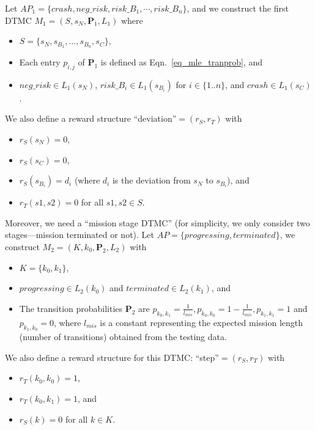 Let $AP_1=\{crash, neg\_risk, risk\_B_1,\cdots, risk\_B_n\}$, and 
we construct the first DTMC $M_1=(S,s_N,\textbf{P}_1,L_1)$ where
\begin{itemize}
    \item $S=\{s_N, s_{B_1},\dots,s_{B_n}, s_C\}$,
    \item Each entry $p_{i,j}$ of 
$\textbf{P}_1$ is defined as Eqn.~\eqref{eq_mle_tranprob}, and 
    \item $neg\_risk \in L_1(s_N)$,  $risk\_B_i\in L_1(s_{B_i})$ for $i\in \{1..n\}$, and
     $crash \in L_1(s_C)$.
\end{itemize}    We also define a reward structure 
{``deviation''}$=(r_S,r_T)$ with
\begin{itemize}
    \item $r_S(s_N)=0$,
    \item $r_S(s_C)=0$,
    \item $r_S(s_{B_i})=d_i$ (where $d_i$ is the deviation from $s_N$ to $s_{B_i}$), and 
    \item $r_T(s1,s2)=0$ for all $s1, s2 \in S$.
\end{itemize} 


Moreover, we %
need a ``mission stage DTMC'' (for simplicity, we only consider two stages---mission terminated or not). Let $AP=\{progressing,terminated\}$, we construct
$M_2=(K,k_0,\textbf{P}_2,L_2)$ with
\begin{itemize}
    \item $K=\{k_0,k_1\}$,
    \item $progressing \in L_2(k_0)$ and $terminated \in L_2(k_1)$, and 
    \item The transition probabilities $\textbf{P}_2$ are $p_{k_0,k_1}=\frac{1}{l_{mis}},p_{k_0,k_0}=1-\frac{1}{l_{mis}}, p_{k_1,k_1}=1$ and $p_{k_1,k_0}=0$, where $l_{mis}$ is a constant representing the expected mission length (number of transitions) obtained from the testing data.
\end{itemize}  We also define a reward structure for this DTMC:  {``step''}$=(r_S,r_T)$ with
\begin{itemize}
    \item $r_T(k_0,k_0)=1$,
    \item $r_T(k_0,k_1)=1$, and 
    \item $r_S(k)=0$ for all $k \in K$.
\end{itemize}  

